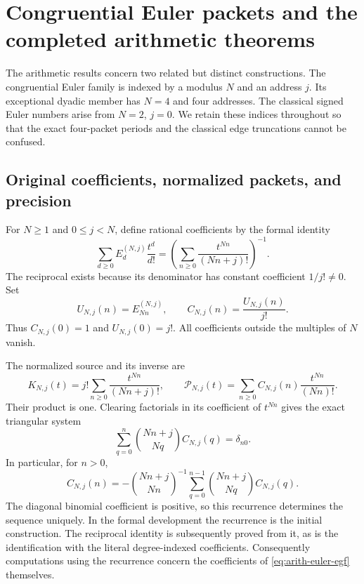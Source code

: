 \section{Congruential Euler packets and the completed arithmetic theorems}
\label{sec:arithmetic}

The arithmetic results concern two related but distinct constructions.  The
congruential Euler family is indexed by a modulus $N$ and an address $j$.
Its exceptional dyadic member has $N=4$ and four addresses.  The classical
signed Euler numbers arise from $N=2$, $j=0$.  We retain these indices
throughout so that the exact four-packet periods and the classical edge
truncations cannot be confused.

\subsection{Original coefficients, normalized packets, and precision}

\begin{definition}\label{def:arith-euler}
For $N\ge1$ and $0\le j<N$, define rational coefficients by the formal identity
\begin{equation}\label{eq:arith-euler-egf}
 \sum_{d\ge0}E_d^{(N,j)}\frac{t^d}{d!}
 =\left(\sum_{n\ge0}\frac{t^{Nn}}{(Nn+j)!}\right)^{-1}.
\end{equation}
The reciprocal exists because its denominator has constant coefficient
$1/j!\ne0$.  Set
\[
 U_{N,j}(n)=E_{Nn}^{(N,j)},\qquad C_{N,j}(n)=\frac{U_{N,j}(n)}{j!}.
\]
Thus $C_{N,j}(0)=1$ and $U_{N,j}(0)=j!$.  All coefficients outside the
multiples of $N$ vanish.
\end{definition}

The normalized source and its inverse are
\begin{equation}\label{eq:arith-kernel}
 K_{N,j}(t)=j!\sum_{n\ge0}\frac{t^{Nn}}{(Nn+j)!},\qquad
 \mathcal P_{N,j}(t)=\sum_{n\ge0}C_{N,j}(n)\frac{t^{Nn}}{(Nn)!}.
\end{equation}
Their product is one.  Clearing factorials in its coefficient of $t^{Nn}$
gives the exact triangular system
\begin{equation}\label{eq:arith-triangular}
 \sum_{q=0}^{n}\binom{Nn+j}{Nq}C_{N,j}(q)=\delta_{n0}.
\end{equation}
In particular, for $n>0$,
\[
 C_{N,j}(n)=-\binom{Nn+j}{Nn}^{-1}
       \sum_{q=0}^{n-1}\binom{Nn+j}{Nq}C_{N,j}(q).
\]
The diagonal binomial coefficient is positive, so this recurrence determines
the sequence uniquely.  In the formal development the recurrence is the
initial construction.  The reciprocal identity is subsequently proved from
it, as is the identification with the literal degree-indexed coefficients.
Consequently computations using the recurrence concern the coefficients of
\eqref{eq:arith-euler-egf} themselves.

